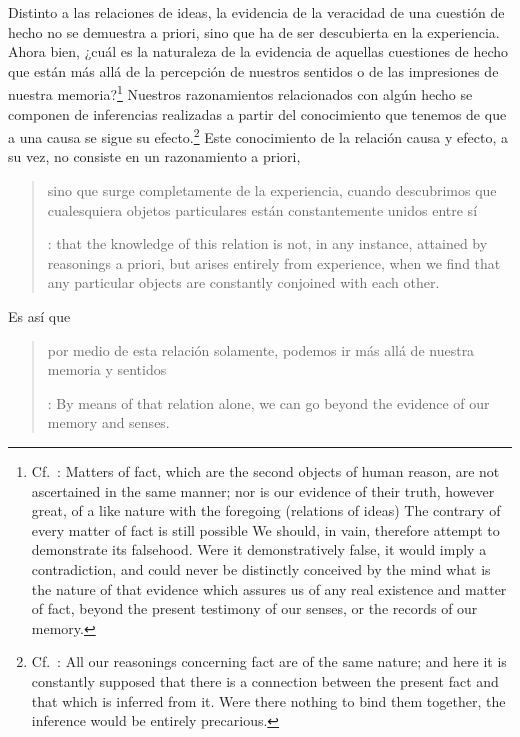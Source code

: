Distinto a las relaciones de ideas, la evidencia de la veracidad de una cuestión
de hecho no se demuestra a priori, sino que ha de ser descubierta en la
experiencia. Ahora bien, ¿cuál es la naturaleza de la evidencia de aquellas
cuestiones de hecho que están más allá de la percepción de nuestros sentidos o
de las impresiones de nuestra memoria?\footnote{Cf.~\cite[\S4,1.
  15]{hume1777enquiry}: Matters of fact, which are the second objects of human
  reason, are not ascertained in the same manner; nor is our evidence of their
  truth, however great, of a like nature with the foregoing (relations of ideas)
  \textelp{} The contrary of every matter of fact is still possible \textelp{}
  We should, in vain, therefore attempt to demonstrate its falsehood. Were it
  demonstratively false, it would imply a contradiction, and could never be
  distinctly conceived by the mind \textelp{} what is the nature of that
  evidence which assures us of any real existence and matter of fact, beyond the
  present testimony of our senses, or the records of our memory.} Nuestros
razonamientos relacionados con algún hecho se componen de inferencias realizadas
a partir del conocimiento que tenemos de que a una causa se sigue su
efecto.\footnote{Cf.~\cite[\S4,1. 16]{hume1777enquiry}: All our reasonings
  concerning fact are of the same nature; and here it is constantly supposed
  that there is a connection between the present fact and that which is inferred
  from it. Were there nothing to bind them together, the inference would be
  entirely precarious.} Este conocimiento de la relación causa y efecto, a su
vez, no consiste en un razonamiento a priori, \blockquote[{\cite[\S4,1.
  17]{hume1777enquiry}}: that the knowledge of this relation is not, in any
instance, attained by reasonings a priori, but arises entirely from experience,
when we find that any particular objects are constantly conjoined with each
other.]{sino que surge completamente de la experiencia, cuando descubrimos que
  cualesquiera objetos particulares están constantemente unidos entre sí}. Es
así que \blockquote[{\cite[\S4,1. 16]{hume1777enquiry}}: By means of that
relation alone, we can go beyond the evidence of our memory and senses.]{por
  medio de esta relación solamente, podemos ir más allá de nuestra memoria y
  sentidos}.

